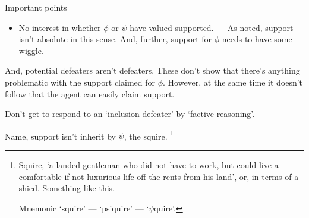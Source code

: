 \newpage


\begin{note}
  Important points
  \begin{itemize}
  \item No interest in whether \(\phi\) or \(\psi\) have valued supported. --- As noted, support isn't absolute in this sense. And, further, support for \(\phi\) needs to have some wiggle.
  \end{itemize}
  And, potential defeaters aren't defeaters.
  These don't show that there's anything problematic with the support claimed for \(\phi\).
  However, at the same time it doesn't follow that the agent can easily claim support.

  Don't get to respond to an `inclusion defeater' by `factive reasoning'.
\end{note}

\begin{note}
  Name, support isn't inherit by \(\psi\), the squire.\nolinebreak
  \footnote{
    Squire, `a landed gentleman who did not have to work, but could live a comfortable if not luxurious life off the rents from his land', or, in terms of a shied.
    Something like this.

    Mnemonic `squire' --- `psiquire' --- `\(\psi\)quire'.
  }
\end{note}


